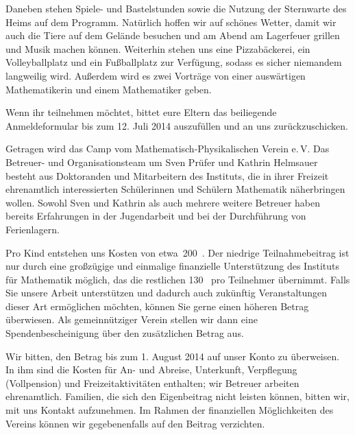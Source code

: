 \documentclass{zettel}
\begin{document}
Daneben stehen Spiele- und Bastelstunden sowie die Nutzung der
Sternwarte des Heims auf dem Programm. Natürlich hoffen wir auf
schönes Wetter, damit wir auch die Tiere auf dem Gelände besuchen
und am Abend am Lagerfeuer grillen und Musik machen können.
Weiterhin stehen uns eine Pizzabäckerei, ein Volleyballplatz und ein
Fußballplatz zur Verfügung, sodass es sicher niemandem langweilig
wird. Außerdem wird es zwei Vorträge von
einer auswärtigen Mathematikerin und einem Mathematiker geben.

\vspace{\medskipamount}

\begin{minipage}{0.54\textwidth}
Wenn ihr teilnehmen möchtet, bittet eure Eltern das beiliegende Anmeldeformular
bis zum 12. Juli 2014 auszufüllen und an uns zurückzuschicken.
\end{minipage}

\newpage

\fontsize{12}{14.4}\selectfont

Getragen wird das Camp vom Mathematisch-Physikalischen Verein e.\,V. Das
Betreuer- und Organisationsteam um Sven Prüfer und Kathrin Helmsauer besteht
aus Doktoranden und Mitarbeitern des Instituts, die in ihrer Freizeit
ehrenamtlich interessierten Schülerinnen und Schülern Mathematik näherbringen
wollen. Sowohl Sven und Kathrin als auch mehrere weitere Betreuer haben
bereits Erfahrungen in der Jugendarbeit und bei der Durch\-füh\-rung von
Ferienlagern.

Pro Kind entstehen uns Kosten von etwa~200~\texteuro. Der niedrige
Teilnahmebeitrag ist nur durch eine großzügige und einmalige finanzielle
Unterstützung des Instituts für Mathematik möglich, das die restlichen
130~\texteuro{} pro Teilnehmer übernimmt.  Falls Sie unsere Arbeit unterstützen
und dadurch auch zukünftig Veranstaltungen dieser Art ermöglichen möchten,
können Sie gerne einen höheren Betrag überwiesen. Als gemeinnütziger Verein
stellen wir dann eine Spendenbescheinigung über den zusätzlichen Betrag aus.

Wir bitten, den Betrag bis zum 1. August 2014 auf unser Konto zu überweisen.
In ihm sind die Kosten für An- und Abreise, Unterkunft, Verpflegung
(Vollpension) und Freizeitaktivitäten enthalten; wir Betreuer arbeiten
ehrenamtlich. Familien, die sich den Eigenbeitrag nicht leisten können, bitten
wir, mit uns Kontakt aufzunehmen. Im Rahmen der finanziellen Möglichkeiten des
Vereins können wir gegebenenfalls auf den Beitrag verzichten.
\end{document}
